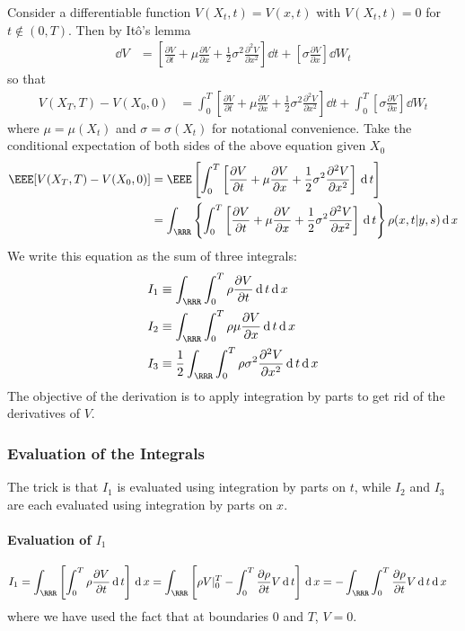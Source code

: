 Consider a differentiable function $V(X_t, t) = V(x, t)$ with $V(X_t, t) = 0$ for $t \notin (0,T)$. Then by It\^o's lemma
\begin{align}
  \dd V & = \left[\frac{\partial V}{\partial t} + \mu\frac{\partial V}{\partial x} + \frac{1}{2}\sigma^2 \frac{\partial^2 V}{\partial x^2}\right]\dd t + \left[\sigma \frac{\partial V}{\partial x}\right]\dd W_t
\end{align}
so that
\begin{align}
  V(X_T, T) - V(X_0, 0) & = \int_0^T \left[\frac{\partial V}{\partial t} + \mu\frac{\partial V}{\partial x} + \frac{1}{2}\sigma^2 \frac{\partial^2 V}{\partial x^2}\right]\dd t + \int_0^T \left[\sigma \frac{\partial V}{\partial x}\right]\dd W_t
\end{align}
where $\mu = \mu(X_t)$ and $\sigma = \sigma(X_t)$ for notational convenience. Take the conditional expectation of both sides of the above equation given $X_0$
\begin{align}
    \EEE[V(X_T, T) - V(X_0, 0)] & = \EEE\left[\int_0^T \left[\frac{\partial V}{\partial t} + \mu\frac{\partial V}{\partial x} + \frac{1}{2}\sigma^2 \frac{\partial^2 V}{\partial x^2}\right]\dd t\right]\nonumber \\
    &= \int_\RRR \left\{\int_0^T \left[\frac{\partial V}{\partial t} + \mu\frac{\partial V}{\partial x} + \frac{1}{2}\sigma^2 \frac{\partial^2 V}{\partial x^2}\right]\dd t\right\}\rho(x,t|y,s) \dd x
\end{align}
We write this equation as the sum of three integrals:
\begin{align}
    I_1 &\equiv \int_\RRR \int_0^T \rho \frac{\partial V}{\partial t} \dd t \dd x \\
    I_2 &\equiv \int_\RRR \int_0^T \rho \mu \frac{\partial V}{\partial x} \dd t \dd x \\
    I_3 &\equiv \frac{1}{2}\int_\RRR \int_0^T \rho \sigma^2 \frac{\partial^2 V}{\partial x^2} \dd t \dd x
\end{align}
The objective of the derivation is to apply integration by parts to get rid of the derivatives of $V$.

\subsubsection{Evaluation of the Integrals}
The trick is that $I_1$ is evaluated using integration by parts on $t$, while $I_2$ and $I_3$ are each evaluated using integration by parts on $x$.

\paragraph{Evaluation of $I_1$}
\begin{align}
  I_1 & = \int_\RRR \left[\int_0^T \rho \frac{\partial V}{\partial t} \dd t \right] \dd x = \int_\RRR \left[\rho V |_0^T -\int_0^T \frac{\partial \rho}{\partial t} V \dd t\right]\dd x  = -\int_\RRR \int_0^T \frac{\partial \rho}{\partial t} V \dd t \dd x
\end{align}
where we have used the fact that at boundaries $0$ and $T$, $V = 0$.

